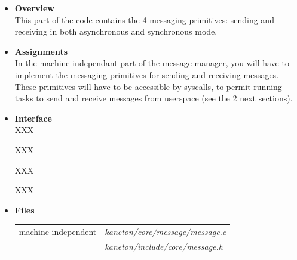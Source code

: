 \begin{itemize}
  \item {\bf Overview}\\

    This part of the code contains the 4 messaging primitives: sending
    and receiving in both asynchronous and synchronous mode.

  \item {\bf Assignments}\\

    In the machine-independant part of the message manager, you will
    have to implement the messaging primitives for sending and
    receiving messages.  These primitives will have to be accessible
    by syscalls, to permit running tasks to send and receive messages
    from userspace (see the 2 next sections).

  \item {\bf Interface}\\

	 {
	   XXX
	 }

	 {
	   XXX
	 }

	 {
	   XXX
	 }

	 {
	   XXX
	 }


  \item {\bf {Files}}\\

    \begin{tabular}{| l | l |}
      \hline
      machine-independent & {\em kaneton/core/message/message.c}\\
      &  {\em kaneton/include/core/message.h}\\\hline
    \end{tabular}
\end{itemize}

